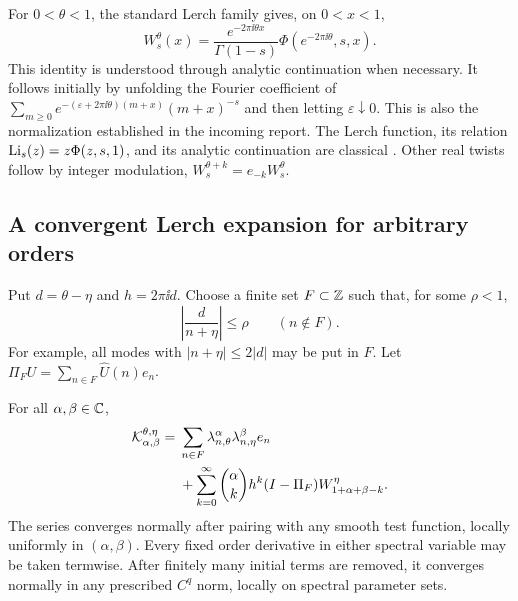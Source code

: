 For $0<\theta<1$, the standard Lerch family gives, on $0<x<1$,
\begin{equation}
 W_s^\theta(x)=\frac{e^{-2\pi\ii\theta x}}{\Gamma(1-s)}
       \Phi(e^{-2\pi\ii\theta},s,x).
 \label{tw:lerch}
\end{equation}
This identity is understood through analytic continuation when necessary.
It follows initially by unfolding the Fourier coefficient of
$\sum_{m\ge0}e^{-(\varepsilon+2\pi\ii\theta)(m+x)}(m+x)^{-s}$
and then letting $\varepsilon\downarrow0$. This is also the
normalization established in the incoming report. The Lerch function,
its relation $\operatorname{Li}_s(z)=z\Phi(z,s,1)$, and its analytic continuation
are classical \cite{DLMFLerch}. Other real twists follow by integer
modulation, $W_s^{\theta+k}=e_{-k}W_s^\theta$.

\subsection{A convergent Lerch expansion for arbitrary orders}

Put $d=\theta-\eta$ and $h=2\pi\ii d$. Choose a finite set
$F\subset\mathbb Z$ such that, for some $\rho<1$,
\begin{equation}
 \left|\frac{d}{n+\eta}\right|\le\rho\qquad(n\notin F).
 \label{tw:Fcondition}
\end{equation}
For example, all modes with $|n+\eta|\le2|d|$ may be put in $F$.
Let $\Pi_FU=\sum_{n\in F}\widehat U(n)e_n$.

\begin{theorem}
\label{tw:tailtheorem}
For all $\alpha,\beta\in\mathbb C$,
\begin{align}
 \mathcal K_{\alpha,\beta}^{\theta,\eta}
 ={}&\sum_{n\in F}
        \lambda_{n,\theta}^{\alpha}\lambda_{n,\eta}^{\beta}e_n
       \notag\\
 &+\sum_{k=0}^{\infty}\binom\alpha k h^k
       (I-\Pi_F)W_{1+\alpha+\beta-k}^{\eta}.
 \label{tw:tailseries}
\end{align}
The series converges normally after pairing with any smooth test
function, locally uniformly in $(\alpha,\beta)$. Every fixed order
derivative in either spectral variable may be taken termwise. After
finitely many initial terms are removed, it converges normally in any
prescribed $C^q$ norm, locally on spectral parameter sets.
\end{theorem}


